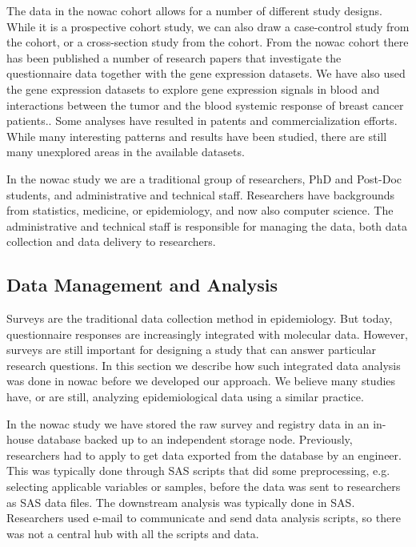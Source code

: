 The data in the \gls{nowac} cohort allows for a number of different study
designs. While it is a prospective cohort study, we can also draw a case-control
study from the cohort, or a cross-section study from the cohort. From the
\gls{nowac} cohort there has been published a number of research papers that
investigate the questionnaire data together with the gene expression
datasets.\cite{olsen2013plasma,dumeaux2010deciphering}  We have also used the
gene expression datasets to explore gene expression signals in blood and
interactions between the tumor and the blood systemic response of breast cancer
patients.\cite{holden2017local, dumeaux2017interactions}. Some analyses have
resulted in patents\cite{blobrec} and commercialization efforts.  While many
interesting patterns and results have been studied, there are still many
unexplored areas in the available datasets.

In the \gls{nowac} study we are a traditional group of researchers, PhD and
Post-Doc students, and administrative and technical staff. Researchers have
backgrounds from statistics, medicine, or epidemiology, and now also computer
science. The administrative and technical staff is responsible for managing the
data, both data collection and data delivery to researchers. 

\subsection{Data Management and Analysis} 
Surveys are the traditional data collection method in epidemiology. But
today, questionnaire responses are increasingly integrated with molecular data.
However, surveys are still important for designing a study that can answer
particular research questions.  In this section we describe how such integrated
data analysis was done in \gls{nowac} before we developed our approach. We
believe many studies have, or are still, analyzing epidemiological data using
a similar practice. 

In the \gls{nowac} study we have stored the raw survey and registry data in an
in-house database backed up to an independent storage node. Previously,
researchers had to apply to get data exported from the database by an engineer.
This was typically done through SAS scripts that did some preprocessing, e.g.
selecting applicable variables or samples, before the data was sent to
researchers as SAS data files. The downstream analysis was typically done in
SAS. Researchers used e-mail to communicate and send data analysis scripts, so
there was not a central hub with all the scripts and data. 


